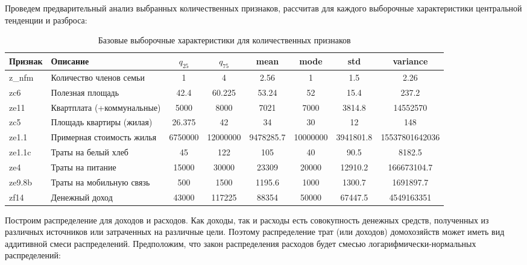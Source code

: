 \documentclass[12pt]{report}
\begin{document}
  \par
  Проведем предварительный анализ выбранных количественных признаков, рассчитав для каждого выборочные характеристики центральной тенденции и разброса:
  \begin{table}[H]
    \begin{tabular}{|l|p{3cm}|c|c|c|c|c|c|}
    \hline
    Признак & Описание                   & $q_{25}$ & $q_{75}$ & mean      & mode     & std       & variance       \\ \hline
    z\_nfm  & Количество членов семьи    & 1        & 4        & 2.56      & 1        & 1.5       & 2.26           \\ \hline
    zc6     & Полезная площадь           & 42.4     & 60.225   & 53.24     & 52       & 15.4      & 237.2          \\ \hline
    ze11    & Квартплата (+коммунальные) & 5000     & 8000     & 7021      & 7000     & 3814.8    & 14552570       \\ \hline
    zc5     & Площадь квартиры (жилая)   & 26.375   & 42       & 34        & 30       & 12        & 148            \\ \hline
    ze1.1   & Примерная стоимость жилья  & 6750000  & 12000000 & 9478285.7 & 10000000 & 3941801.8 & 15537801642036 \\ \hline
    ze1.1c  & Траты на белый хлеб        & 45       & 122      & 105       & 40       & 90.5      & 8182.5         \\ \hline
    ze4     & Траты на питание           & 15000    & 30000    & 23309     & 20000    & 12910.2   & 166673104.7    \\ \hline
    ze9.8b  & Траты на мобильную связь   & 500      & 1500     & 1195.6    & 1000     & 1300.7    & 1691897.7      \\ \hline
    zf14    & Денежный доход             & 43000    & 117225   & 88354     & 50000    & 67447.5   & 4549163351     \\ \hline
    \end{tabular}
    \caption{Базовые выборочные характеристики для количественных признаков}
    \end{table}
    \par
    Построим распределение для доходов и расходов. Как доходы, так и расходы есть совокупность денежных средств, полученных из различных источников или затраченных на различные цели. Поэтому распределение трат (или доходов) домохозяйств может иметь вид аддитивной смеси распределений. Предположим, что закон распределения расходов будет смесью логарифмически-нормальных распределений:
\end{document}
